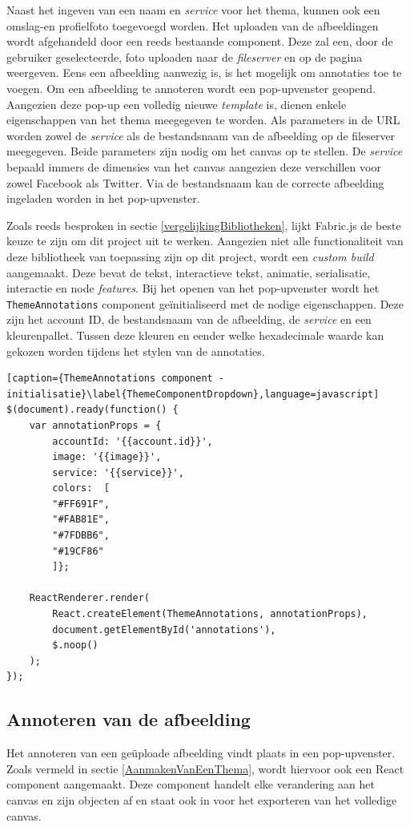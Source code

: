 Naast het ingeven van een naam en \textit{service} voor het thema, kunnen ook een omslag-en profielfoto toegevoegd worden. Het uploaden van de afbeeldingen wordt afgehandeld door een reeds bestaande component. Deze zal een, door de gebruiker geselecteerde, foto uploaden naar de \textit{fileserver} en op de pagina weergeven. Eens een afbeelding aanwezig is, is het mogelijk om annotaties toe te voegen. Om een afbeelding te annoteren wordt een pop-upvenster geopend. Aangezien deze pop-up een volledig nieuwe \textit{template} is, dienen enkele eigenschappen van het thema meegegeven te worden. Als parameters in de URL worden zowel de \textit{service} als de bestandsnaam van de afbeelding op de fileserver meegegeven. Beide parameters zijn nodig om het canvas op te stellen. De \textit{service} bepaald immers de dimensies van het canvas aangezien deze verschillen voor zowel Facebook als Twitter. Via de bestandsnaam kan de correcte afbeelding ingeladen worden in het pop-upvenster.

Zoals reeds besproken in sectie \ref{vergelijkingBibliotheken}, lijkt Fabric.js de beste keuze te zijn om dit project uit te werken. Aangezien niet alle functionaliteit van deze bibliotheek van toepassing zijn op dit project, wordt een \textit{custom build} aangemaakt. Deze bevat de tekst, interactieve tekst, animatie, serialisatie, interactie en node \textit{features}. Bij het openen van het pop-upvenster wordt het \texttt{ThemeAnnotations} component ge\"{i}nitialiseerd met de nodige eigenschappen. Deze zijn het account ID, de bestandsnaam van de afbeelding, de \textit{service} en een kleurenpallet. Tussen deze kleuren en eender welke hexadecimale waarde kan gekozen worden tijdens het stylen van de annotaties.

\begin{lstlisting}[caption={ThemeAnnotations component - initialisatie}\label{ThemeComponentDropdown},language=javascript]
$(document).ready(function() {
	var annotationProps = {
		accountId: '{{account.id}}',
		image: '{{image}}',
		service: '{{service}}',
		colors:  [
		"#FF691F",
		"#FAB81E",
		"#7FDBB6",
		"#19CF86"
		]};
		
	ReactRenderer.render(
		React.createElement(ThemeAnnotations, annotationProps),
		document.getElementById('annotations'),
		$.noop()
	);
});
\end{lstlisting}

\subsection{Annoteren van de afbeelding}\label{AnnoterenVanAfbeelding}
Het annoteren van een ge\"{u}ploade afbeelding vindt plaats in een  pop-upvenster. Zoals vermeld in sectie \ref{AanmakenVanEenThema}, wordt hiervoor ook een React component aangemaakt. Deze component handelt elke verandering aan het canvas en zijn objecten af en staat ook in voor het exporteren van het volledige canvas. 

